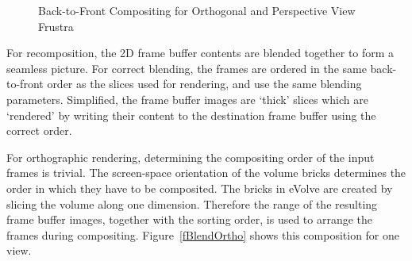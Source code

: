 \documentclass[10pt,a4]{scrartcl}
\newcommand{\fig}[1]{Figure~\ref{#1}}
\begin{document}
\begin{figure}[h!t]
  \hfil
  {\caption{\small\label{fBlend}Back-to-Front Com\-po\-siting for
      Orthogonal and Perspective View Frustra}}
\end{figure}
For recomposition, the 2D frame buffer contents are blended together to
form a seamless picture. For correct blending, the frames are ordered in
the same back-to-front order as the slices used for rendering, and use the
same blending parameters. Simplified, the frame buffer images are
`thick' slices which are `rendered' by writing their content to the
destination frame buffer using the correct order. 

For orthographic rendering, determining the compositing order of the
input frames is trivial. The screen-space orientation of the volume
bricks determines the order in which they have to be composited. The
bricks in \textsf{eVolve} are created by slicing the volume along one
dimension. Therefore the range of the resulting frame buffer images,
together with the sorting order, is used to arrange the frames during
compositing. \fig{fBlendOrtho} shows this composition for one view.
\end{document}
